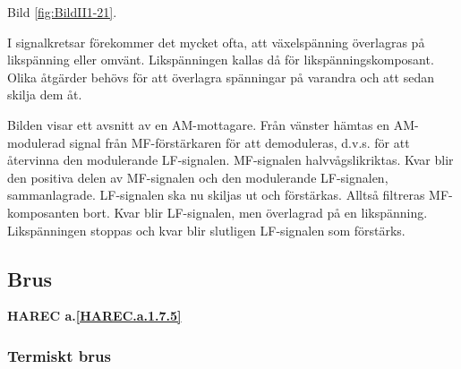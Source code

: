 Bild \ref{fig:BildII1-21}.

I signalkretsar förekommer det mycket ofta, att växelspänning överlagras på
likspänning eller omvänt. Likspänningen kallas då för likspänningskomposant.
Olika åtgärder behövs för att överlagra spänningar på varandra och att sedan
skilja dem åt.

Bilden visar ett avsnitt av en AM-mottagare. Från vänster hämtas en
AM-modulerad signal från MF-förstärkaren för att demoduleras, d.v.s. för att
återvinna den modulerande LF-signalen. MF-signalen halvvågslikriktas. Kvar blir
den positiva delen av MF-signalen och den modulerande LF-signalen,
sammanlagrade. LF-signalen ska nu skiljas ut och förstärkas. Alltså filtreras
MF-komposanten bort. Kvar blir LF-signalen, men överlagrad på en likspänning.
Likspänningen stoppas och kvar blir slutligen LF-signalen som förstärks.

\subsection{Brus}
\textbf{HAREC a.\ref{HAREC.a.1.7.5}\label{myHAREC.a.1.7.5}}

\subsubsection{Termiskt brus}

